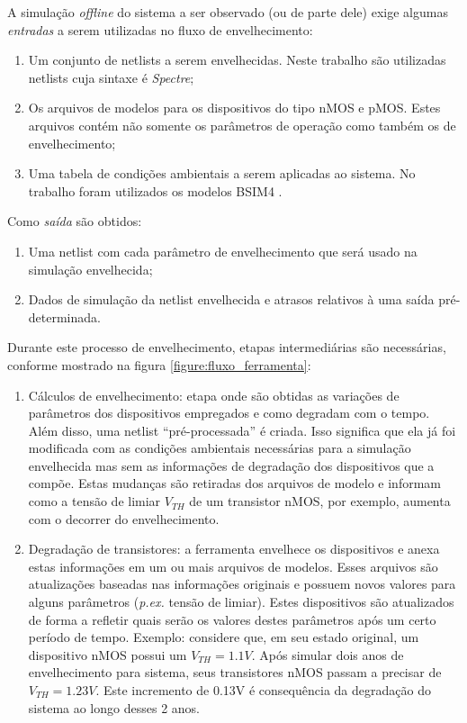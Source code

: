 A simulação \textit{offline} do sistema a ser observado (ou de parte dele) exige algumas \textit{entradas} a serem utilizadas no fluxo de envelhecimento:
\begin{enumerate}
\item Um conjunto de netlists a serem envelhecidas. Neste trabalho são utilizadas netlists cuja sintaxe é \textit{Spectre};
\item Os arquivos de modelos para os dispositivos do tipo nMOS e pMOS. Estes arquivos contém não somente os parâmetros de operação como também os de envelhecimento;
\item Uma tabela de condições ambientais a serem aplicadas ao sistema. No trabalho foram utilizados os modelos BSIM4 \cite{Karl2008}.
\end{enumerate}
Como \textit{saída} são obtidos:
\begin{enumerate}
\item Uma netlist com cada parâmetro de envelhecimento que será usado na simulação envelhecida;
\item Dados de simulação da netlist envelhecida e atrasos relativos à uma saída pré-determinada.
\end{enumerate}

Durante este processo de envelhecimento, etapas intermediárias são necessárias, conforme mostrado na figura \ref{figure:fluxo_ferramenta}:
\begin{enumerate}
	\item Cálculos de envelhecimento: etapa onde são obtidas as variações de parâmetros dos dispositivos empregados e como degradam com o tempo. Além disso, uma netlist ``pré-processada'' é criada. Isso significa que ela já foi modificada com as condições ambientais necessárias para a simulação envelhecida mas sem as informações de degradação dos dispositivos que a compõe. Estas mudanças são retiradas dos arquivos de modelo e informam como a tensão de limiar $V_{TH}$ de um transistor nMOS, por exemplo, aumenta com o decorrer do envelhecimento. 
	\item Degradação de transistores: a ferramenta envelhece os dispositivos e anexa estas informações em um ou mais arquivos de modelos. Esses arquivos são atualizações baseadas nas informações originais e possuem novos valores para alguns parâmetros (\textit{p.ex.} tensão de limiar). Estes dispositivos são atualizados de forma a refletir quais serão os valores destes parâmetros após um certo período de tempo. Exemplo: considere que, em seu estado original, um dispositivo nMOS possui um $V_{TH}=1.1V$. Após simular dois anos de envelhecimento para sistema, seus transistores nMOS passam a precisar de $V_{TH}=1.23V$. Este incremento de 0.13V é consequência da degradação do sistema ao longo desses 2 anos. 
\end{enumerate}

